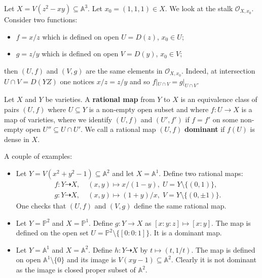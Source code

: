 \documentclass{template}
\begin{document}
\begin{example}
    Let $X=V(z^2-xy) \subseteq \mathbb{A}^3$. Let $x_0=(1,1,1) \in X$. 
    We look at the stalk $\mathcal{O}_{X,x_0}$. Consider two functions:
    \begin{itemize}
        \item $f = x/z$ which is defined on open $U = D(z)$, $x_0 \in U$;
        \item $g = z/y$ which is defined on open $V = D(y)$, $x_0 \in V$;
    \end{itemize}
    then $(U,f)$ and $(V,g)$ are the same elements in $\mathcal{O}_{X,x_0}$.
    Indeed, at intersection $U \cap V = D(YZ)$ one notices $x/z=z/y$ 
    and so $f|_{U \cap V} = g|_{U \cap V}$.
\end{example}

\begin{definition}
    Let $X$ and $Y$ be varieties. A \textbf{rational map} from $Y$ to $X$
    is an equivalence class of pairs $(U,f)$ where $U \subseteq Y$ is a 
    non-empty open subset and where $f: U \to X$ is a map of varieties,
    where we identify $(U,f)$ and $(U',f')$ if $f=f'$ on some non-empty 
    open $U'' \subseteq U \cap U'$. We call a rational map $(U,f)$
    \textbf{dominant} if $f(U)$ is dense in $X$.
\end{definition}

\begin{example}
    A couple of examples:
    \begin{itemize}
        \item Let $Y=V(x^2+y^2-1) \subseteq \mathbb{A}^2$ and let $X=\mathbb{A}^1$.
    Define two rational maps:
    \begin{align*}
        f: Y \dashrightarrow X, \; &(x,y) \mapsto x/(1-y), \; U = Y \setminus \{(0,1)\}, \\
        g: Y \dashrightarrow X, \; &(x,y) \mapsto (1+y)/x, \; V = Y \setminus \{(0,\pm 1)\}.
    \end{align*}
    One checks that $(U,f)$ and $(V,g)$ define the same rational map.
        \item Let $Y=\mathbb{P}^2$ and $X=\mathbb{P}^1$. Define $g: Y \to X$ as
    $[x:y:z] \mapsto [x:y]$. The map is defined on the open set $U =
    \mathbb{P}^2 \setminus \{[0:0:1]\}$. It is a dominant map.
        \item Let $Y=\mathbb{A}^1$ and $X=\mathbb{A}^2$. Define $h: Y \dashrightarrow X$
        by $t \mapsto (t,1/t)$. The map is defined on open $\mathbb{A}^1 \setminus \{0\}$
        and its image is $V(xy-1) \subseteq \mathbb{A}^2$. Clearly it is not dominant
        as the image is closed proper subset of $\mathbb{A}^2$.
    \end{itemize}
\end{example}
\end{document}
